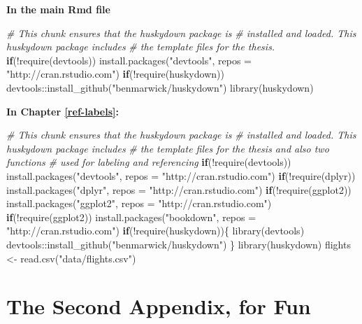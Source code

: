 \documentclass [11pt, proquest] {uwthesis}[2015/03/03]
\newenvironment{Shaded}{\begin{snugshade}}{\end{snugshade}}
\newcommand{\AttributeTok}[1]{\textcolor[rgb]{0.77,0.63,0.00}{#1}}
\newcommand{\CommentTok}[1]{\textcolor[rgb]{0.56,0.35,0.01}{\textit{#1}}}
\newcommand{\ControlFlowTok}[1]{\textcolor[rgb]{0.13,0.29,0.53}{\textbf{#1}}}
\newcommand{\FunctionTok}[1]{\textcolor[rgb]{0.00,0.00,0.00}{#1}}
\newcommand{\NormalTok}[1]{#1}
\newcommand{\OtherTok}[1]{\textcolor[rgb]{0.56,0.35,0.01}{#1}}
\newcommand{\SpecialCharTok}[1]{\textcolor[rgb]{0.00,0.00,0.00}{#1}}
\newcommand{\StringTok}[1]{\textcolor[rgb]{0.31,0.60,0.02}{#1}}
\begin{document}
\textbf{In the main Rmd file}
\begin{Shaded}
\begin{Highlighting}[]
\CommentTok{\# This chunk ensures that the huskydown package is}
\CommentTok{\# installed and loaded. This huskydown package includes}
\CommentTok{\# the template files for the thesis.}
\ControlFlowTok{if}\NormalTok{(}\SpecialCharTok{!}\FunctionTok{require}\NormalTok{(devtools))}
  \FunctionTok{install.packages}\NormalTok{(}\StringTok{"devtools"}\NormalTok{, }\AttributeTok{repos =} \StringTok{"http://cran.rstudio.com"}\NormalTok{)}
\ControlFlowTok{if}\NormalTok{(}\SpecialCharTok{!}\FunctionTok{require}\NormalTok{(huskydown))}
\NormalTok{  devtools}\SpecialCharTok{::}\FunctionTok{install\_github}\NormalTok{(}\StringTok{"benmarwick/huskydown"}\NormalTok{)}
\FunctionTok{library}\NormalTok{(huskydown)}
\end{Highlighting}
\end{Shaded}
\textbf{In Chapter \ref{ref-labels}:}
\begin{Shaded}
\begin{Highlighting}[]
\CommentTok{\# This chunk ensures that the huskydown package is}
\CommentTok{\# installed and loaded. This huskydown package includes}
\CommentTok{\# the template files for the thesis and also two functions}
\CommentTok{\# used for labeling and referencing}
\ControlFlowTok{if}\NormalTok{(}\SpecialCharTok{!}\FunctionTok{require}\NormalTok{(devtools))}
  \FunctionTok{install.packages}\NormalTok{(}\StringTok{"devtools"}\NormalTok{, }\AttributeTok{repos =} \StringTok{"http://cran.rstudio.com"}\NormalTok{)}
\ControlFlowTok{if}\NormalTok{(}\SpecialCharTok{!}\FunctionTok{require}\NormalTok{(dplyr))}
    \FunctionTok{install.packages}\NormalTok{(}\StringTok{"dplyr"}\NormalTok{, }\AttributeTok{repos =} \StringTok{"http://cran.rstudio.com"}\NormalTok{)}
\ControlFlowTok{if}\NormalTok{(}\SpecialCharTok{!}\FunctionTok{require}\NormalTok{(ggplot2))}
    \FunctionTok{install.packages}\NormalTok{(}\StringTok{"ggplot2"}\NormalTok{, }\AttributeTok{repos =} \StringTok{"http://cran.rstudio.com"}\NormalTok{)}
\ControlFlowTok{if}\NormalTok{(}\SpecialCharTok{!}\FunctionTok{require}\NormalTok{(ggplot2))}
    \FunctionTok{install.packages}\NormalTok{(}\StringTok{"bookdown"}\NormalTok{, }\AttributeTok{repos =} \StringTok{"http://cran.rstudio.com"}\NormalTok{)}
\ControlFlowTok{if}\NormalTok{(}\SpecialCharTok{!}\FunctionTok{require}\NormalTok{(huskydown))\{}
  \FunctionTok{library}\NormalTok{(devtools)}
\NormalTok{  devtools}\SpecialCharTok{::}\FunctionTok{install\_github}\NormalTok{(}\StringTok{"benmarwick/huskydown"}\NormalTok{)}
\NormalTok{  \}}
\FunctionTok{library}\NormalTok{(huskydown)}
\NormalTok{flights }\OtherTok{\textless{}{-}} \FunctionTok{read.csv}\NormalTok{(}\StringTok{"data/flights.csv"}\NormalTok{)}
\end{Highlighting}
\end{Shaded}
\hypertarget{the-second-appendix-for-fun}{%
\chapter{The Second Appendix, for Fun}\label{the-second-appendix-for-fun}}
\end{document}
